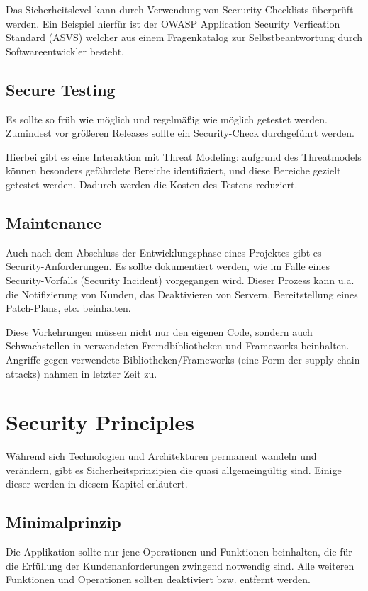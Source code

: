 Das Sicherheitslevel kann durch Verwendung von Secrurity-Checklists überprüft werden. Ein Beispiel hierfür ist der OWASP Application Security Verfication Standard (ASVS) welcher aus einem Fragenkatalog zur Selbstbeantwortung durch Softwareentwickler besteht.

\subsection{Secure Testing}

Es sollte so früh wie möglich und regelmäßig wie möglich getestet werden. Zumindest vor größeren Releases sollte ein Security-Check durchgeführt werden.

Hierbei gibt es eine Interaktion mit Threat Modeling: aufgrund des Threatmodels können besonders gefährdete Bereiche identifiziert, und diese Bereiche gezielt getestet werden. Dadurch werden die Kosten des Testens reduziert.

\subsection{Maintenance}

Auch nach dem Abschluss der Entwicklungsphase eines Projektes gibt es Security-Anforderungen. Es sollte dokumentiert werden, wie im Falle eines Security-Vorfalls (Security Incident) vorgegangen wird. Dieser Prozess kann u.a. die Notifizierung von Kunden, das Deaktivieren von Servern, Bereitstellung eines Patch-Plans, etc. beinhalten.

Diese Vorkehrungen müssen nicht nur den eigenen Code, sondern auch Schwachstellen in verwendeten Fremdbibliotheken und Frameworks beinhalten. Angriffe gegen verwendete Bibliotheken/Frameworks (eine Form der supply-chain attacks) nahmen in letzter Zeit zu.

\section{Security Principles}

Während sich Technologien und Architekturen permanent wandeln und verändern, gibt es Sicherheitsprinzipien die quasi allgemeingültig sind. Einige dieser werden in diesem Kapitel erläutert.

\subsection{Minimalprinzip}

Die Applikation sollte nur jene Operationen und Funktionen beinhalten, die für die Erfüllung der Kundenanforderungen zwingend notwendig sind. Alle weiteren Funktionen und Operationen sollten deaktiviert bzw. entfernt werden.

